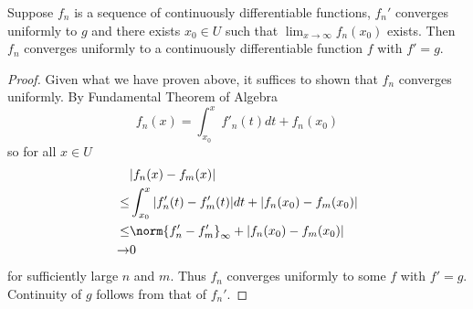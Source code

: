 \documentclass[a4paper]{article}
\begin{document}
\begin{proposition}
  Suppose \(f_n\) is a sequence of continuously differentiable functions, \(f_n'\) converges uniformly to \(g\) and there exists \(x_0 \in U\) such that \(\lim_{x \to \infty} f_n(x_0)\) exists. Then \(f_n\) converges uniformly to a continuously differentiable function \(f\) with \(f' = g\).
\end{proposition}

\begin{proof}
  Given what we have proven above, it suffices to shown that \(f_n\) converges uniformly. By Fundamental Theorem of Algebra
  \[
    f_n(x) = \int_{x_0}^x f'_n(t) dt + f_n(x_0)
  \]
  so for all \(x \in U\)
  \begin{align*}
    &|f_n(x) - f_m(x)| \\
    \leq& \int_{x_0}^x |f_n'(t) - f_m'(t)| dt + |f_n(x_0) - f_m(x_0)| \\
    \leq& \norm{f'_n - f'_m}_\infty + |f_n(x_0) - f_m(x_0)| \\
    \to&0
  \end{align*}
  for sufficiently large \(n\) and \(m\). Thus \(f_n\) converges uniformly to some \(f\) with \(f' = g\). Continuity of \(g\) follows from that of \(f_n'\).
\end{proof}
\end{document}
